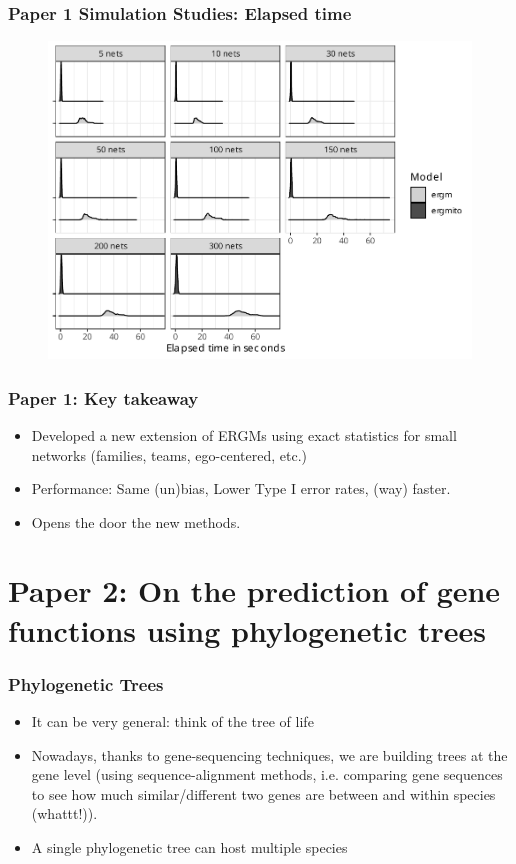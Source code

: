 \documentclass[aspectratio=169, 10pt]{beamer}\usepackage[]{graphicx}\usepackage[]{color}
\def\cursection{\frame{\frametitle{Contents}\tableofcontents[current]}}
\begin{document}
\begin{frame}
\frametitle{Paper 1 Simulation Studies: Elapsed time}

\begin{figure}
\centering
\includegraphics[width=.6\linewidth]{bias-elapsed-02-various-sizes-4-5-ttriad.pdf}
\end{figure}

\end{frame}

\begin{frame}
\frametitle{Paper 1: Key takeaway}
\pause
\begin{itemize}[<+->]
\item Developed a new extension of ERGMs using exact statistics for small networks
(families, teams, ego-centered, etc.)
\item Performance: Same (un)bias, Lower Type I error rates, (way) faster.
\item Opens the door the new methods.
\end{itemize}
\end{frame}


\section{Paper 2: On the prediction of gene functions using phylogenetic trees}
\cursection

\begin{frame}
\frametitle{Phylogenetic Trees}
\pause
\begin{itemize}[<+->]
\item It can be very general: think of the tree of life
\item Nowadays, thanks to gene-sequencing techniques, we are building trees at the
gene level (using sequence-alignment methods, i.e. comparing gene sequences to see how much similar/different two genes are between and within species (whattt!)).
\item A single phylogenetic tree can host multiple species
\end{itemize}

\end{frame}
\end{document}
